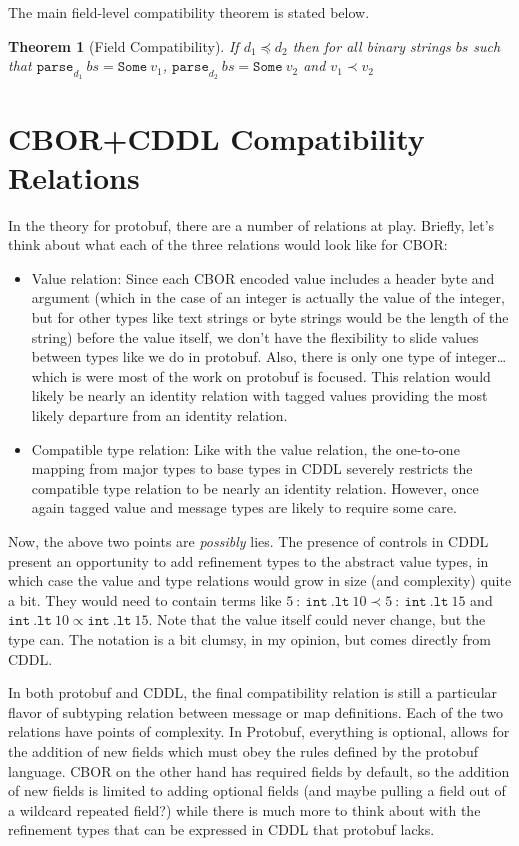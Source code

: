 \documentclass[11pt]{article}
\theoremstyle{definition}
\theoremstyle{plain}
\newtheorem{theorem}{Theorem}
\begin{document}
The main field-level compatibility theorem is stated below.
\\
\begin{theorem}[Field Compatibility]
  If $d_1 \preceq d_2$ then for all binary strings $bs$ such that
  $\mathtt{parse}_{d_1}\ bs = \mathtt{Some}\ v_1$, $\mathtt{parse}_{d_2}\ bs =
  \mathtt{Some}\ v_2$ and $v_1 \prec v_2$
\end{theorem}

\section{CBOR+CDDL Compatibility Relations}

In the theory for protobuf, there are a number of relations at play. Briefly,
let's think about what each of the three relations would look like for CBOR:

\begin{itemize}
\item Value relation: Since each CBOR encoded value includes a header byte and
  argument (which in the case of an integer is actually the value of the
  integer, but for other types like text strings or byte strings would be the
  length of the string) before the value itself, we don't have the flexibility
  to slide values between types like we do in protobuf. Also, there is only one
  type of integer\ldots which is were most of the work on protobuf is focused. This
  relation would likely be nearly an identity relation with tagged values
  providing the most likely departure from an identity relation.
\item Compatible type relation: Like with the value relation, the one-to-one
  mapping from major types to base types in CDDL severely restricts the
  compatible type relation to be nearly an identity relation. However, once
  again tagged value and message types are likely to require some care.
\end{itemize}

Now, the above two points are \emph{possibly} lies. The presence of controls in
CDDL present an opportunity to add refinement types to the abstract value types,
in which case the value and type relations would grow in size (and complexity)
quite a bit. They would need to contain terms like
$5\ :\ \mathtt{int}\ .\mathtt{lt}\ 10 \prec 5\ :\ \mathtt{int}\ .\mathtt{lt}\ 15$
and $\mathtt{int}\ \mathtt{.lt}\ 10 \propto \mathtt{int}\ \mathtt{.lt}\ 15$. Note that
the value itself could never change, but the type can. The notation is a bit
clumsy, in my opinion, but comes directly from CDDL.

In both protobuf and CDDL, the final compatibility relation is still a
particular flavor of subtyping relation between message or map definitions. Each
of the two relations have points of complexity. In Protobuf, everything is
optional, allows for the addition of new fields which must obey the rules
defined by the protobuf language. CBOR on the other hand has required fields by
default, so the addition of new fields is limited to adding optional fields (and
maybe pulling a field out of a wildcard repeated field?) while there is much
more to think about with the refinement types that can be expressed in CDDL that
protobuf lacks.

\printbibliography{}
\end{document}
